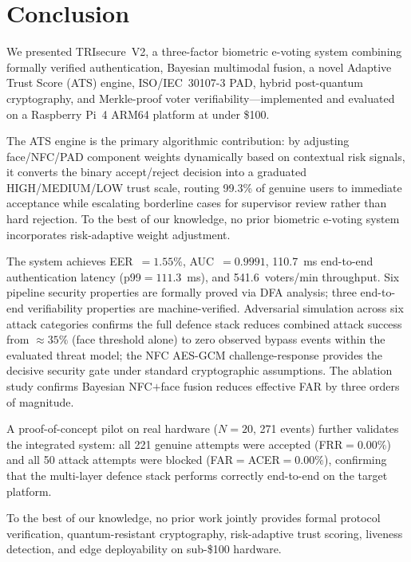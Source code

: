\documentclass[conference]{IEEEtran}
\begin{document}
\section{Conclusion}
\label{sec:conclusion}

We presented TRIsecure~V2, a three-factor biometric e-voting system
combining formally verified authentication, Bayesian multimodal fusion,
a novel Adaptive Trust Score (ATS) engine, ISO/IEC~30107-3 PAD, hybrid
post-quantum cryptography, and Merkle-proof voter verifiability—implemented
and evaluated on a Raspberry Pi~4 ARM64 platform at under \$100.

The ATS engine is the primary algorithmic contribution: by adjusting
face/NFC/PAD component weights dynamically based on contextual risk signals,
it converts the binary accept/reject decision into a graduated
HIGH/MEDIUM/LOW trust scale, routing 99.3\% of genuine users to immediate
acceptance while escalating borderline cases for supervisor review rather
than hard rejection. To the best of our knowledge, no prior biometric e-voting system
incorporates risk-adaptive weight adjustment.

The system achieves EER~\(=1.55\%\), AUC~\(=0.9991\), 110.7~ms
end-to-end authentication latency (p99\(=111.3\)~ms), and 541.6~voters/min
throughput. Six pipeline security properties are formally proved via DFA
analysis; three end-to-end verifiability properties are machine-verified.
Adversarial simulation across six attack categories confirms the full
defence stack reduces combined attack success from \(\approx35\%\) (face
threshold alone) to zero observed bypass events within the evaluated
threat model; the NFC AES-GCM challenge-response provides the
decisive security gate under standard cryptographic assumptions. The ablation study confirms Bayesian NFC\(+\)face
fusion reduces effective FAR by three orders of magnitude.

A proof-of-concept pilot on real hardware (\(N{=}20\), 271 events)
further validates the integrated system: all 221 genuine attempts
were accepted (FRR\(=0.00\%\)) and all 50 attack attempts were
blocked (FAR\(=\)ACER\(=0.00\%\)), confirming that the multi-layer
defence stack performs correctly end-to-end on the target platform.

To the best of our knowledge, no prior work jointly provides formal protocol
verification, quantum-resistant cryptography, risk-adaptive trust scoring,
liveness detection, and edge deployability on sub-\$100 hardware.
\end{document}
